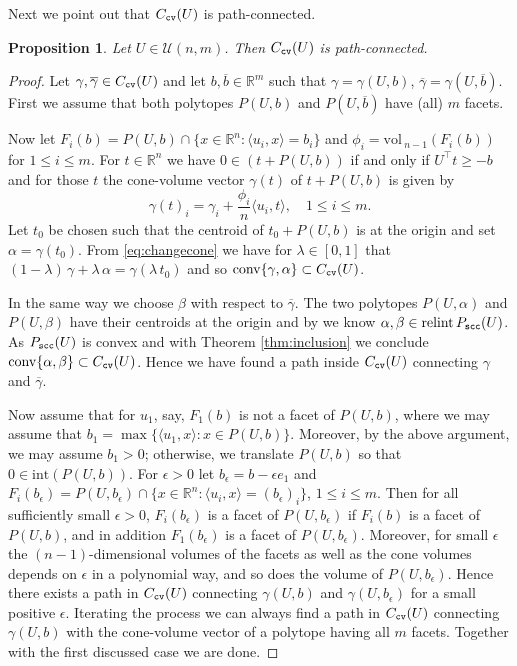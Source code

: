 \documentclass[11pt, a4paper, twoside, reqno]{amsart}
\DeclareMathOperator*{\conv}{conv}
\newcommand{\R}{\mathbb{R}}
\newtheorem{proposition}[theorem]{Proposition}
\theoremstyle{definition}
\theoremstyle{remark}
\newcommand{\vol}{\mathrm{vol}\,}
\newcommand{\scc}{{\tt scc}}
\newcommand{\cv}{{\tt cv}}
\newcommand{\ov}{\overline}
\DeclareMathOperator{\relint}{relint}
\numberwithin{equation}{section}
\begin{document}
Next  we point out that $C_\cv(U)$ is path-connected.
\begin{proposition} Let $U\in\mathcal{U}(n,m)$. Then $C_\cv(U)$ is
  path-connected. 

\label{prop:pathconnected}
\end{proposition}
\begin{proof} Let $\gamma,\ov\gamma \in C_\cv(U)$ and let $b,\ov
  b\in \R^m$ such that $\gamma=\gamma(U, b)$, $\ov
  \gamma=\gamma(U,\ov b)$.  First we assume that both polytopes
  $P(U,b)$ and $P(U,\ov b)$ have (all) $m$ facets.
 



  Now let $F_i(b)=P(U,b)\cap\{x\in\R^n: \langle u_i,x\rangle =b_i\}$
  and $\phi_i=\vol_{n-1}(F_i(b))$ for $1\leq i\leq m$. 
 For $t\in\R^n$ we have
  $0\in (t+P(U,b))$  if and only if  $U^\intercal t \geq -b$ and for
  those $t$
  the cone-volume vector $\gamma(t)$ of  $t+P(U,b)$ is given by
  \begin{equation}
         \gamma(t)_i= \gamma_i+\frac{\phi_i}{n}\langle u_i,
         t\rangle,\quad 1\leq i\leq m.
 \label{eq:changecone}
       \end{equation}
  Let $t_0$ be chosen such that the centroid of $t_0+P(U,b)$ is at the
  origin and set $\alpha=\gamma(t_0)$.  From \eqref{eq:changecone} we
  have for $\lambda\in [0,1]$ that
  $(1-\lambda)\,\gamma+\lambda\,\alpha=\gamma(\lambda\,t_0)$ and so
  $\conv\{\gamma,\alpha\}\subset C_\cv(U)$.

  In the same way we choose $\beta$ with respect to $\ov\gamma$. The
  two polytopes $P(U,\alpha)$ and $P(U,\beta)$ have their
  centroids at the origin and by \cite[Thm.~I]{henk2014cone} we know
  $\alpha,\beta\in\relint P_\scc(U)$. As $ P_\scc(U)$ is convex
  and with Theorem \ref{thm:inclusion} we conclude
  $\conv\{\alpha,\beta\}\subset C_\cv(U)$. Hence we have found a path
  inside $C_\cv(U)$ connecting $\gamma$ and $\ov\gamma$.

 Now assume that for $u_1$, say, $F_1(b)$ is not a facet of
 $P(U,b)$, where we may assume that $b_1=\max\{\langle u_1, x\rangle: x\in
 P(U,b)\}$. Moreover, by the above argument, we may assume \(b_1 > 0\); otherwise, we translate \(P(U,b)\) so that \(0 \in \mathrm{int}(P(U,b))\). For $\epsilon>0$ let $b_\epsilon=b-\epsilon e_1$ and
 $F_i(b_\epsilon)=P(U,b_\epsilon)\cap\{x\in\R^n: \langle u_i,x\rangle
 =(b_\epsilon)_i\}$, $1\leq i\leq m$. Then for all sufficiently small
 $\epsilon >0$, $F_i(b_\epsilon)$ is a facet of $P(U,b_\epsilon)$ if
 $F_i(b)$ is a facet of $P(U,b)$, and in addition  $F_1(b_\epsilon)$
 is a facet of $P(U,b_\epsilon)$. Moreover, for small $\epsilon$ the
 $(n-1)$-dimensional volumes of the facets
 as well as  the cone volumes depends on $\epsilon$ in a polynomial way, and
 so does the volume of $P(U,b_\epsilon)$. Hence there exists a path
 in $C_\cv(U)$ connecting $\gamma(U,b)$ and $\gamma(U,b_\epsilon)$ for
 a small positive $\epsilon$. Iterating the process we can always find
 a path in $C_\cv(U)$ connecting  $\gamma(U,b)$ with the cone-volume
 vector of a polytope having all $m$ facets. Together with the first
 discussed case we are done. 
\end{proof}
\end{document}
